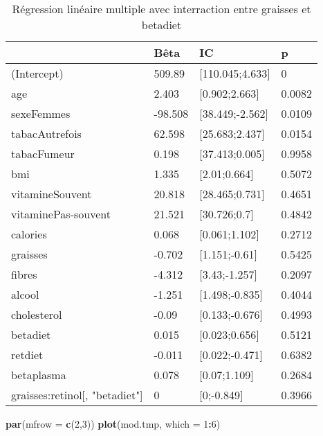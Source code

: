 \documentclass[]{article}
\newenvironment{Shaded}{\begin{snugshade}}{\end{snugshade}}
\newcommand{\KeywordTok}[1]{\textcolor[rgb]{0.13,0.29,0.53}{\textbf{#1}}}
\newcommand{\DataTypeTok}[1]{\textcolor[rgb]{0.13,0.29,0.53}{#1}}
\newcommand{\DecValTok}[1]{\textcolor[rgb]{0.00,0.00,0.81}{#1}}
\newcommand{\OperatorTok}[1]{\textcolor[rgb]{0.81,0.36,0.00}{\textbf{#1}}}
\newcommand{\NormalTok}[1]{#1}
\begin{document}
\begin{table}

\caption{\label{tab:unnamed-chunk-75}Régression linéaire multiple avec interraction entre graisses et betadiet}
\centering
\begin{tabular}[t]{l|l|l|l}
\hline
  & Bêta & IC & p\\
\hline
\rowcolor[HTML]{BBD2E1}  (Intercept) & 509.89 & [110.045;4.633] & 0\\
\hline
age & 2.403 & [0.902;2.663] & 0.0082\\
\hline
\rowcolor[HTML]{BBD2E1}  sexeFemmes & -98.508 & [38.449;-2.562] & 0.0109\\
\hline
tabacAutrefois & 62.598 & [25.683;2.437] & 0.0154\\
\hline
\rowcolor[HTML]{BBD2E1}  tabacFumeur & 0.198 & [37.413;0.005] & 0.9958\\
\hline
bmi & 1.335 & [2.01;0.664] & 0.5072\\
\hline
\rowcolor[HTML]{BBD2E1}  vitamineSouvent & 20.818 & [28.465;0.731] & 0.4651\\
\hline
vitaminePas-souvent & 21.521 & [30.726;0.7] & 0.4842\\
\hline
\rowcolor[HTML]{BBD2E1}  calories & 0.068 & [0.061;1.102] & 0.2712\\
\hline
graisses & -0.702 & [1.151;-0.61] & 0.5425\\
\hline
\rowcolor[HTML]{BBD2E1}  fibres & -4.312 & [3.43;-1.257] & 0.2097\\
\hline
alcool & -1.251 & [1.498;-0.835] & 0.4044\\
\hline
\rowcolor[HTML]{BBD2E1}  cholesterol & -0.09 & [0.133;-0.676] & 0.4993\\
\hline
betadiet & 0.015 & [0.023;0.656] & 0.5121\\
\hline
\rowcolor[HTML]{BBD2E1}  retdiet & -0.011 & [0.022;-0.471] & 0.6382\\
\hline
betaplasma & 0.078 & [0.07;1.109] & 0.2684\\
\hline
\rowcolor[HTML]{BBD2E1}  graisses:retinol[, "betadiet"] & 0 & [0;-0.849] & 0.3966\\
\hline
\end{tabular}
\end{table}

\begin{Shaded}
\begin{Highlighting}[]
\KeywordTok{par}\NormalTok{(}\DataTypeTok{mfrow =} \KeywordTok{c}\NormalTok{(}\DecValTok{2}\NormalTok{,}\DecValTok{3}\NormalTok{))}
\KeywordTok{plot}\NormalTok{(mod.tmp, }\DataTypeTok{which =} \DecValTok{1}\OperatorTok{:}\DecValTok{6}\NormalTok{)}
\end{Highlighting}
\end{Shaded}
\end{document}
